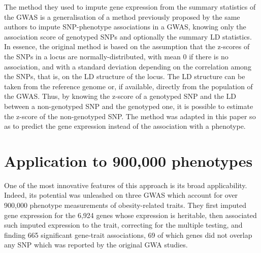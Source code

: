 \documentclass[../main.tex]{subfiles}
\begin{document}
The method they used to impute gene expression from the summary 
statistics of the GWAS is a generalisation of a method previously 
proposed by the same authors to impute SNP-phenotype associations in a 
GWAS, knowing only the association score of genotyped 
SNPs\cite{Pasaniuc2014} and optionally the summary LD statistics. In 
essence, the original method is based on the assumption that the 
z-scores of the SNPs in a locus are normally-distributed, with mean 0 if 
there is no association, and with a standard deviation depending on the 
correlation among the SNPs, that is, on the LD structure of the locus. 
The LD structure can be taken from the reference genome\cite{1000G} or, 
if available, directly from the population of the GWAS. Thus, by knowing 
the z-score of a genotyped SNP and the LD between a non-genotyped SNP 
and the genotyped one, it is possible to estimate the z-score of the 
non-genotyped SNP. The method was adapted in this paper so as to predict 
the gene expression instead of the association with a 
phenotype.

\section{Application to 900,000 phenotypes}

One of the most innovative features of this approach is its broad 
applicability. Indeed, its potential was unleashed on three GWAS which 
account for over 900,000 phenotype measurements of obesity-related 
traits. They first 
imputed gene expression for the 6,924 genes whose expression is 
heritable, then associated such imputed expression to the trait, 
correcting for the multiple testing, and finding 665 significant 
gene-trait associations, 69 of which genes did not overlap any SNP which 
was reported by the original GWA studies.


\end{document}
